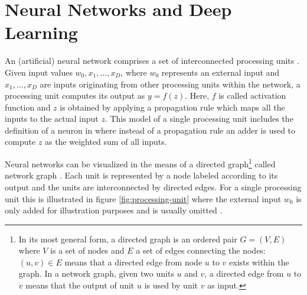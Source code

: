 \section{Neural Networks and Deep Learning}

An (artificial) neural network comprises a set of interconnected processing units \cite[p.~80-81]{Bishop:1995}. Given input values $w_0,x_1,\ldots,x_D$, where $w_0$ represents an external input and $x_1,\ldots,x_D$ are inputs originating from other processing units within the network, a processing unit computes its output as $y = f(z)$. Here, $f$ is called activation function and $z$ is obtained by applying a propagation rule which maps all the inputs to the actual input $z$. This model of a single processing unit includes the definition of a neuron in \cite{Haykin:2005} where instead of a propagation rule an adder is used to compute $z$ as the weighted sum of all inputs.

Neural networks can be visualized in the means of a directed graph\footnote{In its most general form, a directed graph is an ordered pair $G = (V,E)$ where $V$ is a set of nodes and $E$ a set of edges connecting the nodes: $(u,v) \in E$ means that a directed edge from node $u$ to $v$ exists within the graph. In a network graph, given two units $u$ and $v$, a directed edge from $u$ to $v$ means that the output of unit $u$ is used by unit $v$ as input.} called network graph \cite[p.~117-120]{Bishop:1995}. Each unit is represented by a node labeled according to its output and the units are interconnected by directed edges. For a single processing unit this is illustrated in figure \ref{fig:processing-unit} where the external input $w_0$ is only added for illustration purposes and is usually omitted \cite[p.~116-120]{Bishop:1995}.

